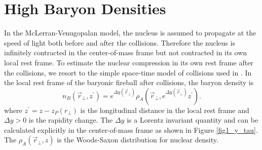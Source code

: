 \documentclass[a4paper]{jpconf}
\begin{document}
\section{High Baryon Densities}
In the McLerran-Venugopalan model, the nucleus is assumed to propagate at the speed of light both before and after the collisions. Therefore the nucleus is infinitely contracted in the center-of-mass frame but not contracted in its own local rest frame. To estimate the nuclear compression in its own rest frame after the collisions,  we resort to the simple space-time model of collisions used in \cite{Anishetty1980}. In the local rest frame of the baryonic fireball after collisions, the baryon density is 
\begin{equation}
n_B(\vec{r}_{\perp},z^{\prime}) = e^{\Delta y(\vec{r}_{\perp})} \rho_A(\vec{r}_{\perp}, e^{\Delta y(\vec{r}_{\perp})} z^{\prime}).
\end{equation}
where $z^{\prime} = z -z_P(r_{\perp})$ is the longitudinal distance in the local rest frame and $\Delta y >0$ is the rapidity change. The $\Delta y$ is a Lorentz invariant quantity and can be calculated explicitly in the center-of-mass frame as shown in Figure \ref{fig1_y_tau}. The $\rho_A(\vec{r}_{\perp},z)$ is the Woods-Saxon distribution for nuclear density. 
\end{document}
